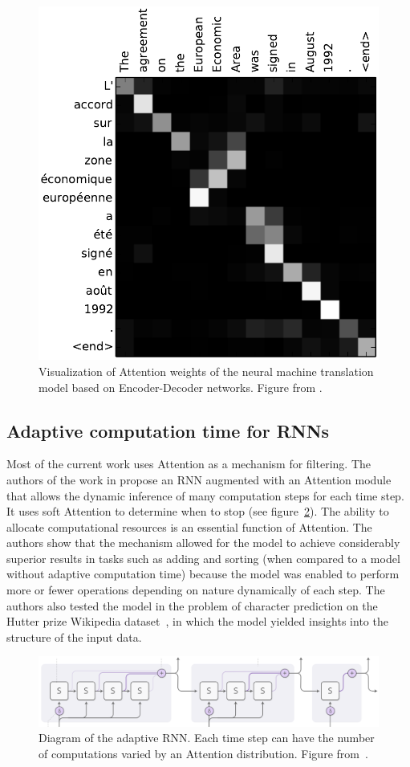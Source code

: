 \documentclass[12pt]{article}
\begin{document}
\begin{figure}
\begin{center}
    \includegraphics[width=0.31\linewidth]{./img/nt-att.png}
\caption{
    Visualization of Attention weights of the neural machine translation model
    based on Encoder-Decoder networks.
    Figure from \cite{ref:enc-dec}.
}
\label{fig:ntatt}
\end{center}
\end{figure}

\subsection{Adaptive computation time for RNNs}
Most of the current work uses Attention as a mechanism for filtering.
The authors of the work in \cite{ref:act} propose an RNN augmented with an Attention module that allows the dynamic inference of many computation steps for each time step.
It uses soft Attention to determine when to stop (see figure~\ref{fig:adaptive-comp}).
The ability to allocate computational resources is an essential function of Attention.
The authors show that the mechanism allowed for the model to achieve considerably superior results
in tasks such as adding and sorting (when compared to a model without adaptive computation time)
because the model was enabled to perform more or fewer operations depending on nature dynamically
of each step.
The authors also tested the model in the problem of character prediction on the Hutter prize Wikipedia
dataset~\cite{ref:hutter}, in which the model yielded insights into the structure of the input data.

\begin{figure}
\begin{center}
    \includegraphics[width=0.9\linewidth]{./img/adaptive_comp.png}
\caption{
    Diagram of the adaptive RNN.
    Each time step can have the number of computations varied by an Attention distribution.
    Figure from~\cite{ref:distill}.
}
\label{fig:adaptive-comp}
\end{center}
\end{figure}
\end{document}
